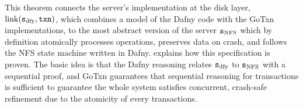 This theorem connects the server's implementation at the disk layer,
$\mathrm{link}(\texttt{s}_{\mathrm{dfy}}, \texttt{txn})$, which combines a model of the Dafny code with the GoTxn
implementations, to the most abstract version of the server $\texttt{s}_{\mathrm{NFS}}$ which by
definition atomically processes operations, preserves data on crash, and follows
the NFS state machine written in Dafny.  explains how this
specification is proven. The basic idea is that the Dafny reasoning relates
$\texttt{s}_{\mathrm{dfy}}$ to $\texttt{s}_{\mathrm{NFS}}$ with a sequential proof, and GoTxn guarantees that sequential
reasoning for transactions is sufficient to guarantee the whole system satisfies
concurrent, crash-safe refinement due to the atomicity of every transactions.

